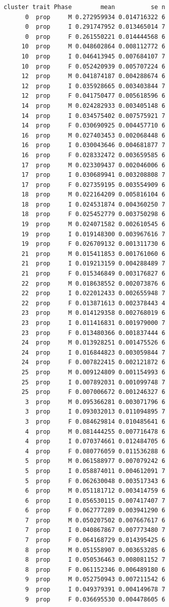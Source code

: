 \documentclass[
  landscape]{article}
\begin{document}
\begin{verbatim}
 cluster trait Phase        mean          se n
       0  prop     M 0.272959934 0.014716322 6
       0  prop     I 0.291747952 0.013465014 7
       0  prop     F 0.261550221 0.014444568 6
      10  prop     M 0.048602864 0.008112772 6
      10  prop     I 0.046413945 0.007684107 7
      10  prop     F 0.052420939 0.005707224 6
      12  prop     M 0.041874187 0.004288674 6
      12  prop     I 0.035928665 0.003403844 7
      12  prop     F 0.041750477 0.005618596 6
      14  prop     M 0.024282933 0.003405148 6
      14  prop     I 0.034575402 0.007575921 7
      14  prop     F 0.030690925 0.004457710 6
      16  prop     M 0.027403453 0.002068448 6
      16  prop     I 0.030043646 0.004681877 7
      16  prop     F 0.028332472 0.003659585 6
      17  prop     M 0.023309437 0.002046006 6
      17  prop     I 0.030689941 0.003208808 7
      17  prop     F 0.027359195 0.003554909 6
      18  prop     M 0.022164209 0.005816104 6
      18  prop     I 0.024531874 0.004360250 7
      18  prop     F 0.025452779 0.003750298 6
      19  prop     M 0.024071582 0.002610545 6
      19  prop     I 0.019148300 0.003967616 7
      19  prop     F 0.026709132 0.001311730 6
      21  prop     M 0.015411853 0.001761060 6
      21  prop     I 0.019213159 0.004288489 7
      21  prop     F 0.015346849 0.003176827 6
      22  prop     M 0.018638552 0.002073876 6
      22  prop     I 0.022012433 0.002655948 7
      22  prop     F 0.013871613 0.002378443 4
      23  prop     M 0.014129358 0.002768019 6
      23  prop     I 0.011416831 0.001979000 7
      23  prop     F 0.013480366 0.001837444 6
      24  prop     M 0.013928251 0.001475526 6
      24  prop     I 0.016844823 0.003059844 7
      24  prop     F 0.007822415 0.002121872 6
      25  prop     M 0.009124809 0.001154993 6
      25  prop     I 0.007892031 0.001099748 7
      25  prop     F 0.007006672 0.001246327 6
       3  prop     M 0.095366281 0.003071796 6
       3  prop     I 0.093032013 0.011094895 7
       3  prop     F 0.084629814 0.010485641 6
       4  prop     M 0.081444255 0.007716478 6
       4  prop     I 0.070374661 0.012484705 6
       4  prop     F 0.080776059 0.011536288 6
       5  prop     M 0.061588977 0.007079242 6
       5  prop     I 0.058874011 0.004612091 7
       5  prop     F 0.062630048 0.003517343 6
       6  prop     M 0.051181712 0.003414759 6
       6  prop     I 0.056530115 0.007417407 7
       6  prop     F 0.062777289 0.003941290 6
       7  prop     M 0.050207502 0.007667617 6
       7  prop     I 0.040867867 0.007773480 7
       7  prop     F 0.064168729 0.014395425 6
       8  prop     M 0.051558907 0.003653285 6
       8  prop     I 0.050536463 0.008081152 7
       8  prop     F 0.061152346 0.006489180 6
       9  prop     M 0.052750943 0.007211542 6
       9  prop     I 0.049379391 0.004149678 7
       9  prop     F 0.036695530 0.004478605 6
\end{verbatim}
\end{document}
